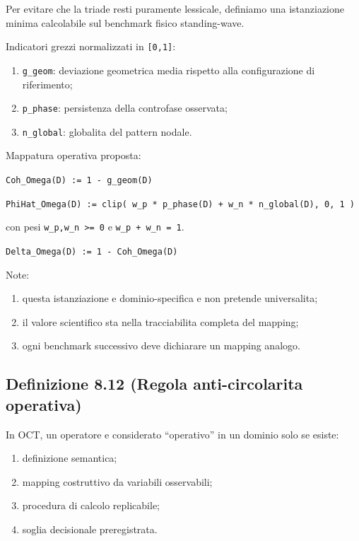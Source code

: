 Per evitare che la triade resti puramente lessicale, definiamo una istanziazione minima calcolabile sul benchmark fisico standing-wave.

Indicatori grezzi normalizzati in \texttt{{[}0,1{]}}:

\begin{enumerate}
\def\labelenumi{\arabic{enumi}.}
\tightlist
\item
  \texttt{g\_geom}: deviazione geometrica media rispetto alla configurazione di riferimento;
\item
  \texttt{p\_phase}: persistenza della controfase osservata;
\item
  \texttt{n\_global}: globalita del pattern nodale.
\end{enumerate}

Mappatura operativa proposta:

\texttt{Coh\_Omega(D)\ :=\ 1\ -\ g\_geom(D)}

\texttt{PhiHat\_Omega(D)\ :=\ clip(\ w\_p\ *\ p\_phase(D)\ +\ w\_n\ *\ n\_global(D),\ 0,\ 1\ )}

con pesi \texttt{w\_p,w\_n\ \textgreater{}=\ 0} e \texttt{w\_p\ +\ w\_n\ =\ 1}.

\texttt{Delta\_Omega(D)\ :=\ 1\ -\ Coh\_Omega(D)}

Note:

\begin{enumerate}
\def\labelenumi{\arabic{enumi}.}
\tightlist
\item
  questa istanziazione e dominio-specifica e non pretende universalita;
\item
  il valore scientifico sta nella tracciabilita completa del mapping;
\item
  ogni benchmark successivo deve dichiarare un mapping analogo.
\end{enumerate}

\subsection{Definizione 8.12 (Regola anti-circolarita operativa)}

In OCT, un operatore e considerato ``operativo'' in un dominio solo se esiste:

\begin{enumerate}
\def\labelenumi{\arabic{enumi}.}
\tightlist
\item
  definizione semantica;
\item
  mapping costruttivo da variabili osservabili;
\item
  procedura di calcolo replicabile;
\item
  soglia decisionale preregistrata.
\end{enumerate}

